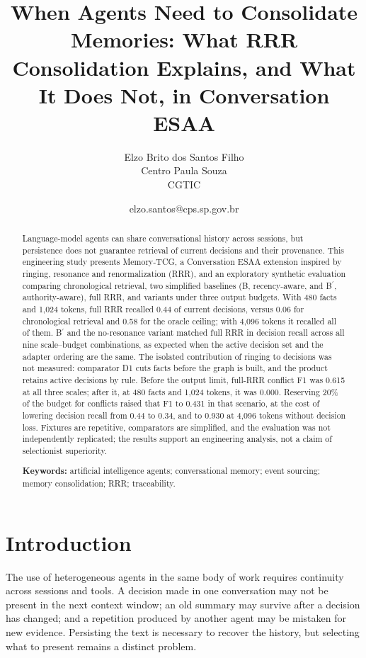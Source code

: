 \documentclass[11pt,a4paper]{article}
\title{\textbf{When Agents Need to Consolidate Memories: What RRR Consolidation Explains, and What It Does Not, in Conversation ESAA}\\[0.8em]
  }
\author{Elzo Brito dos Santos Filho\\[0.3em]
  \small Centro Paula Souza\\ CGTIC}
\date{elzo.santos@cps.sp.gov.br\\[0.3em]}
\begin{document}
\maketitle

\begin{abstract}
Language-model agents can share conversational history across sessions, but persistence does not guarantee retrieval of current decisions and their provenance. This engineering study presents Memory-TCG, a Conversation ESAA extension inspired by ringing, resonance and renormalization (RRR), and an exploratory synthetic evaluation comparing chronological retrieval, two simplified baselines (B, recency-aware, and B\ensuremath{^{\prime}}, authority-aware), full RRR, and variants under three output budgets. With 480 facts and 1,024 tokens, full RRR recalled 0.44 of current decisions, versus 0.06 for chronological retrieval and 0.58 for the oracle ceiling; with 4,096 tokens it recalled all of them. B\ensuremath{^{\prime}} and the no-resonance variant matched full RRR in decision recall across all nine scale--budget combinations, as expected when the active decision set and the adapter ordering are the same. The isolated contribution of ringing to decisions was not measured: comparator D1 cuts facts before the graph is built, and the product retains active decisions by rule. Before the output limit, full-RRR conflict F1 was 0.615 at all three scales; after it, at 480 facts and 1,024 tokens, it was 0.000. Reserving 20\% of the budget for conflicts raised that F1 to 0.431 in that scenario, at the cost of lowering decision recall from 0.44 to 0.34, and to 0.930 at 4,096 tokens without decision loss. Fixtures are repetitive, comparators are simplified, and the evaluation was not independently replicated; the results support an engineering analysis, not a claim of selectionist superiority.
\par\medskip\noindent\textbf{Keywords:} artificial intelligence agents; conversational memory; event sourcing; memory consolidation; RRR; traceability.
\end{abstract}

\section{Introduction}\label{sec:1}
The use of heterogeneous agents in the same body of work requires continuity across sessions and tools. A decision made in one conversation may not be present in the next context window; an old summary may survive after a decision has changed; and a repetition produced by another agent may be mistaken for new evidence. Persisting the text is necessary to recover the history, but selecting what to present remains a distinct problem.
\end{document}
